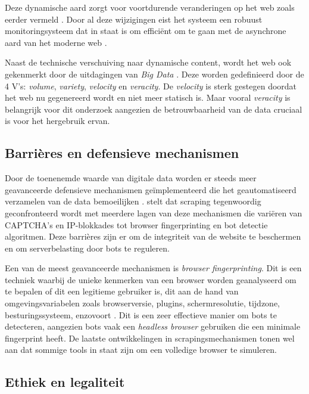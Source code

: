 Deze dynamische aard zorgt voor voortdurende veranderingen op het web zoals eerder vermeld \autocite{ChangeSurvey2019}.
Door al deze wijzigingen eist het systeem een robuust monitoringsysteem dat in staat is om efficiënt om te gaan met de asynchrone aard van het moderne web \autocite{ChangeSurvey2019}.

Naast de technische verschuiving naar dynamische content, wordt het web ook gekenmerkt door de uitdagingen van \textit{Big Data} \autocite{Krotov2018}. Deze worden gedefinieerd door de 4 V's: \textit{volume}, \textit{variety}, \textit{velocity} en \textit{veracity}. De \textit{velocity} is sterk gestegen doordat het web nu gegenereerd wordt en niet meer statisch is. Maar vooral \textit{veracity} is belangrijk voor dit onderzoek aangezien de betrouwbaarheid van de data cruciaal is voor het hergebruik ervan.

\subsection{Barrières en defensieve mechanismen}

Door de toenenemde waarde van digitale data worden er steeds meer geavanceerde defensieve mechanismen geïmplementeerd die het geautomatiseerd verzamelen van de data bemoeilijken \autocite{Tseriotis2025}.
\textcite{Tseriotis2025} stelt dat scraping tegenwoordig geconfronteerd wordt met meerdere lagen van deze mechanismen die variëren van CAPTCHA's en IP-blokkades tot browser fingerprinting en bot detectie algoritmen.
Deze barrières zijn er om de integriteit van de website te beschermen en om serverbelasting door bots te reguleren.

Een van de meest geavanceerde mechanismen is \textit{browser fingerprinting}. Dit is een techniek waarbij de unieke kenmerken van een browser worden geanalyseerd om te bepalen of dit een legitieme gebruiker is, dit aan de hand van omgevingsvariabelen zoals browserversie, plugins, schermresolutie, tijdzone, besturingssysteem, enzovoort \autocite{Tseriotis2025}. Dit is een zeer effectieve manier om bots te detecteren, aangezien bots vaak een \textit{headless browser} gebruiken die een minimale fingerprint heeft.
De laatste ontwikkelingen in scrapingsmechanismen tonen wel aan dat sommige tools in staat zijn om een volledige browser te simuleren.

\subsection{Ethiek en legaliteit}
\label{subsec:ethiek-legaliteit}


